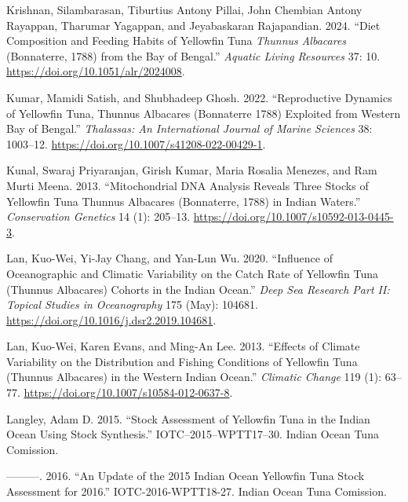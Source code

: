 \documentclass[
]{scrartcl}
\newlength{\cslhangindent}
\newenvironment{CSLReferences}[2] %
 {\begin{list}{}{%
  \setlength{\itemindent}{0pt}
  \setlength{\leftmargin}{0pt}
  \setlength{\parsep}{0pt}
  \ifodd #1
   \setlength{\leftmargin}{\cslhangindent}
   \setlength{\itemindent}{-1\cslhangindent}
  \fi
  \setlength{\itemsep}{#2\baselineskip}}}
 {\end{list}}
\begin{document}
\begin{CSLReferences}{1}{0}
Krishnan, Silambarasan, Tiburtius Antony Pillai, John Chembian Antony
Rayappan, Tharumar Yagappan, and Jeyabaskaran Rajapandian. 2024. {``Diet
Composition and Feeding Habits of Yellowfin Tuna {\emph{Thunnus}}{
\emph{Albacares}} ({Bonnaterre}, 1788) from the {Bay} of {Bengal}.''}
\emph{Aquatic Living Resources} 37: 10.
\url{https://doi.org/10.1051/alr/2024008}.

Kumar, Mamidi Satish, and Shubhadeep Ghosh. 2022. {``Reproductive
{Dynamics} of {Yellowfin Tuna}, {Thunnus} Albacares ({Bonnaterre} 1788)
{Exploited} from {Western Bay} of {Bengal}.''} \emph{Thalassas: An
International Journal of Marine Sciences} 38: 1003--12.
\url{https://doi.org/10.1007/s41208-022-00429-1}.

Kunal, Swaraj Priyaranjan, Girish Kumar, Maria Rosalia Menezes, and Ram
Murti Meena. 2013. {``Mitochondrial {DNA} Analysis Reveals Three Stocks
of Yellowfin Tuna {Thunnus} Albacares ({Bonnaterre}, 1788) in {Indian}
Waters.''} \emph{Conservation Genetics} 14 (1): 205--13.
\url{https://doi.org/10.1007/s10592-013-0445-3}.

Lan, Kuo-Wei, Yi-Jay Chang, and Yan-Lun Wu. 2020. {``Influence of
Oceanographic and Climatic Variability on the Catch Rate of Yellowfin
Tuna ({Thunnus} Albacares) Cohorts in the {Indian Ocean}.''} \emph{Deep
Sea Research Part II: Topical Studies in Oceanography} 175 (May):
104681. \url{https://doi.org/10.1016/j.dsr2.2019.104681}.

Lan, Kuo-Wei, Karen Evans, and Ming-An Lee. 2013. {``Effects of Climate
Variability on the Distribution and Fishing Conditions of Yellowfin Tuna
({Thunnus} Albacares) in the Western {Indian Ocean}.''} \emph{Climatic
Change} 119 (1): 63--77.
\url{https://doi.org/10.1007/s10584-012-0637-8}.

Langley, Adam D. 2015. {``Stock Assessment of Yellowfin Tuna in the
{Indian Ocean} Using {Stock Synthesis}.''} IOTC--2015--WPTT17--30.
Indian Ocean Tuna Comission.

---------. 2016. {``An Update of the 2015 {Indian Ocean Yellowfin Tuna}
Stock Assessment for 2016.''} IOTC-2016-WPTT18-27. Indian Ocean Tuna
Comission.


\end{CSLReferences}
\end{document}

